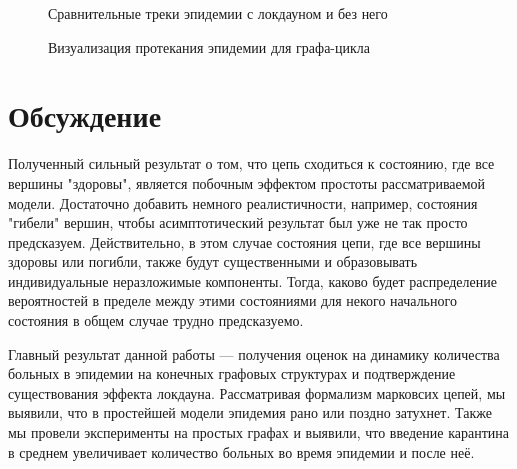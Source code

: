 \begin{figure}[h]
\begin{center}
\begin{minipage}{0.49\linewidth}
				\centering
				Сравнительные треки эпидемии с локдауном и без него
			\end{minipage}
		\end{center}
		
		\caption{Визуализация протекания эпидемии для графа-цикла}\label{pic:evidence_2}
	\end{figure}

	\section*{Обсуждение}
	
	Полученный сильный результат о том, что цепь сходиться к состоянию, где все вершины "здоровы", является побочным эффектом простоты рассматриваемой модели.  Достаточно добавить немного реалистичности, например, состояния "гибели" вершин, чтобы асимптотический результат был уже не так просто предсказуем. Действительно, в этом случае состояния цепи, где все вершины здоровы или погибли, также будут существенными и образовывать индивидуальные неразложимые компоненты. Тогда, каково будет распределение вероятностей в пределе между этими состояниями для некого начального состояния в общем случае трудно предсказуемо.
	
	Главный результат данной работы --- получения оценок на динамику количества больных в эпидемии на конечных графовых структурах и подтверждение существования эффекта локдауна. Рассматривая формализм марковсих цепей, мы выявили, что в простейшей модели эпидемия рано или поздно затухнет. Также мы провели эксперименты на простых графах и выявили, что введение карантина в среднем увеличивает количество больных во время эпидемии и после неё.

	\printbibliography
	

